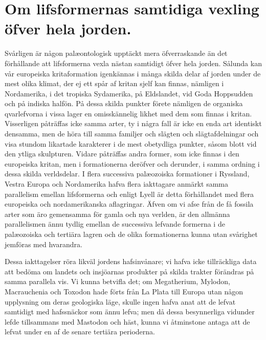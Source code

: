 \section[Om lifsformernas samtidiga vexling]{Om lifsformernas samtidiga vexling öfver hela jorden.}

Svårligen är någon palæontologisk upptäckt mera öfverraskande än det förhållande att lifsformerna vexla nästan samtidigt öfver hela jorden. Sålunda kan vår europeiska kritaformation igenkännas i många skilda delar af jorden under de mest olika klimat, der ej ett spår af kritan sjelf kan finnas, nämligen i Nordamerika, i det tropiska Sydamerika, på Eldslandet, vid Goda Hoppsudden och på indiska halfön. På dessa skilda punkter förete nämligen de organiska qvarlefvorna i vissa lager en omisskännelig likhet med dem som finnas i kritan. Visserligen påträffas icke samma arter, ty i några fall är icke en enda art identiskt densamma, men de höra till samma familjer och slägten och slägtafdelningar och visa stundom likartade karakterer i de mest obetydliga punkter, såsom blott vid den ytliga skulpturen. Vidare påträffas andra former, som icke finnas i den europeiska kritan, men i formationerna deröfver och derunder, i samma ordning i dessa skilda verldsdelar. I flera successiva palæozoiska formationer i Ryssland, Vestra Europa och Nordamerika hafva flera iakttagare anmärkt samma parallelism emellan lifsformerna och enligt Lyell är detta förhållandet med flera europeiska och nordamerikanska aflagringar. Äfven om vi afse från de få fossila arter som äro gemensamma för gamla och nya verlden, är den allmänna parallelismen ännu tydlig emellan de successiva lefvande formerna i de palæozoiska och tertiära lagren och de olika formationerna kunna utan svårighet jemföras med hvarandra.

Dessa iakttagelser röra likväl jordens hafsinvånare; vi hafva icke tillräckliga data att bedöma om landets och insjöarnas produkter på skilda trakter förändras på samma parallela vis. Vi kunna betvifla det; om Megatherium, Mylodon, Macrauchenia och Toxodon hade förts från La Plata till Europa utan någon upplysning om deras geologiska läge, skulle ingen hafva anat att de lefvat samtidigt med hafssnäckor som ännu lefva; men då dessa besynnerliga vidunder lefde tillsammans med Mastodon och häst, kunna vi åtminstone antaga att de lefvat under en af de senare tertiära perioderna.

